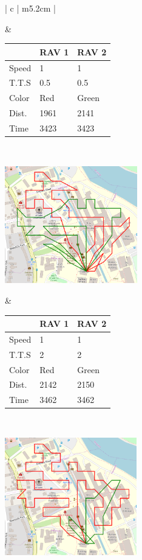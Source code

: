 \begin{table}[h!]
\begin{tabular}{ | c | m{5.2cm} | }
\begin{minipage}[c][53mm][c]{.6\textwidth}
    \end{minipage}
    &
    \small
    \begin{tabular}{m{10mm}|m{11mm} m{11mm} }
        & RAV 1 & RAV 2\\
        \hline
        Speed& 1 & 1 \\
        T.T.S & 0.5 & 0.5 \\
        Color & Red & Green \\
        \hline
        Dist.& 1961 & 2141 \\
        Time& 3423 & 3423 \\
    \end{tabular}
    \normalsize
    \\
    \hline
    
    \begin{minipage}[c][53mm][c]{.6\textwidth}
      \includegraphics[width=\linewidth, height=51mm]{Chapters/MultiAgentCoverage/MultipleTravellingSalesman/Figs/ORToolsSolns/Example3.PNG}

    \end{minipage}
    &
    \small
    \begin{tabular}{m{10mm}|m{11mm} m{11mm}}
        & RAV 1 & RAV 2\\
        \hline
        Speed& 1 & 1 \\
        T.T.S & 2 & 2 \\
        Color & Red & Green \\
        \hline
        Dist.& 2142 & 2150 \\
        Time& 3462 & 3462 \\
    \end{tabular}
    \normalsize
    \\
    \hline
    
    \begin{minipage}[c][53mm][c]{.6\textwidth}
      \includegraphics[width=\linewidth, height=51mm]{Chapters/MultiAgentCoverage/MultipleTravellingSalesman/Figs/ORToolsSolns/Example4.PNG}


\end{minipage}
\end{tabular}
\end{table}
